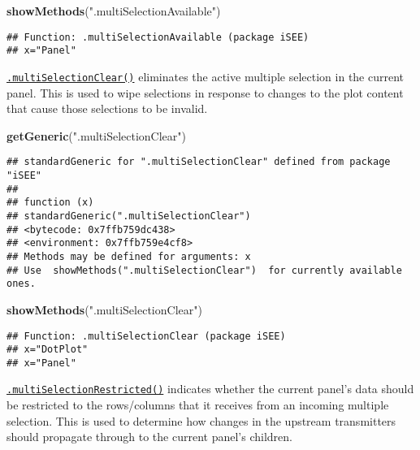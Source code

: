 \documentclass[
]{book}
\newenvironment{Shaded}{\begin{snugshade}}{\end{snugshade}}
\newcommand{\KeywordTok}[1]{\textcolor[rgb]{0.13,0.29,0.53}{\textbf{#1}}}
\newcommand{\NormalTok}[1]{#1}
\newcommand{\StringTok}[1]{\textcolor[rgb]{0.31,0.60,0.02}{#1}}
\begin{document}
\begin{Shaded}
\begin{Highlighting}[]
\KeywordTok{showMethods}\NormalTok{(}\StringTok{".multiSelectionAvailable"}\NormalTok{)}
\end{Highlighting}
\end{Shaded}

\begin{verbatim}
## Function: .multiSelectionAvailable (package iSEE)
## x="Panel"
\end{verbatim}

\href{https://isee.github.io/iSEE/reference/multi-select-generics.html}{\texttt{.multiSelectionClear()}} eliminates the active multiple selection in the current panel.
This is used to wipe selections in response to changes to the plot content that cause those selections to be invalid.

\begin{Shaded}
\begin{Highlighting}[]
\KeywordTok{getGeneric}\NormalTok{(}\StringTok{".multiSelectionClear"}\NormalTok{)}
\end{Highlighting}
\end{Shaded}

\begin{verbatim}
## standardGeneric for ".multiSelectionClear" defined from package "iSEE"
## 
## function (x) 
## standardGeneric(".multiSelectionClear")
## <bytecode: 0x7ffb759dc438>
## <environment: 0x7ffb759e4cf8>
## Methods may be defined for arguments: x
## Use  showMethods(".multiSelectionClear")  for currently available ones.
\end{verbatim}

\begin{Shaded}
\begin{Highlighting}[]
\KeywordTok{showMethods}\NormalTok{(}\StringTok{".multiSelectionClear"}\NormalTok{)}
\end{Highlighting}
\end{Shaded}

\begin{verbatim}
## Function: .multiSelectionClear (package iSEE)
## x="DotPlot"
## x="Panel"
\end{verbatim}

\href{https://isee.github.io/iSEE/reference/multi-select-generics.html}{\texttt{.multiSelectionRestricted()}} indicates whether the current panel's data should be restricted to the rows/columns that it receives from an incoming multiple selection.
This is used to determine how changes in the upstream transmitters should propagate through to the current panel's children.
\end{document}
